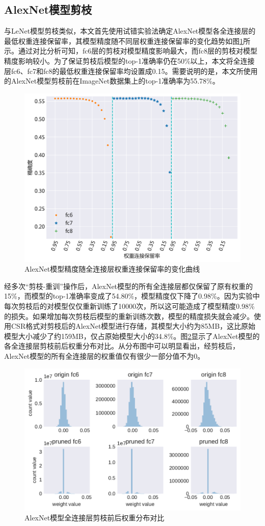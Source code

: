 
\subsection{AlexNet模型剪枝}

与LeNet模型剪枝类似，本文首先使用试错实验法确定AlexNet模型各全连接层的最低权重连接保留率，其模型精度随不同层权重连接保留率的变化趋势如图\ref{figure:figure23}所示。通过对比分析可知，fc6层的剪枝对模型精度影响最大，而fc8层的剪枝对模型精度影响较小。为了保证剪枝后模型的top-1准确率仍在50\%以上，本文将全连接层fc6、fc7和fc8的最低权重连接保留率均设置成0.15。需要说明的是，本文所使用的AlexNet模型剪枝前在ImageNet\cite{imagenet.org}数据集上的top-1准确率为55.78\%。

\begin{figure}[htbp]
    \centering
    \includegraphics[height=0.4\textwidth]{figures/alexnet_pruned_threshold.pdf}
    \caption{AlexNet模型精度随全连接层权重连接保留率的变化曲线}\label{figure:figure23}
\end{figure}

经多次“剪枝-重训”操作后，AlexNet模型的所有全连接层都仅保留了原有权重的15\%，而模型的top-1准确率变成了54.80\%，模型精度仅下降了0.98\%。因为实验中每次剪枝后的对模型仅仅重新训练了10000次，所以这可能造成了模型精度0.98\%的损失。如果增加每次剪枝后模型的重新训练次数，模型的精度损失就会减少。使用CSR格式对剪枝后的AlexNet模型进行存储，其模型大小约为85MB，这比原始模型大小减少了约159MB，仅占原始模型大小的34.8\%。图\ref{figure:figure24}显示了AlexNet模型的各全连接层剪枝前后权重分布对比。从分布图中可以明显看出，经剪枝后，AlexNet模型的所有全连接层的权重值仅有很少一部分值不为0。

\begin{figure}[htbp]
    \centering
    \includegraphics[height=0.41\textwidth]{figures/alexnet_pruned_weights.pdf}
    \caption{AlexNet模型全连接层剪枝前后权重分布对比}\label{figure:figure24}
\end{figure}



